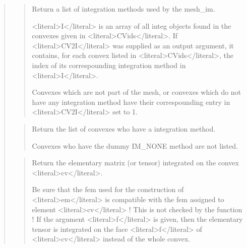 \documentclass[a4paper,11pt,english]{sphinxmanual}
\begin{document}
\sphinxAtStartPar
{}
\begin{quote}

\sphinxAtStartPar
{}
\begin{quote}

\sphinxAtStartPar
Return a list of integration methods used by the mesh\_im.

\sphinxAtStartPar
\textless{}literal\textgreater{}I\textless{}/literal\textgreater{} is an array of all integ objects found in the convexes
given in \textless{}literal\textgreater{}CVids\textless{}/literal\textgreater{}. If \textless{}literal\textgreater{}CV2I\textless{}/literal\textgreater{} was supplied as an output argument, it
contains, for each convex listed in \textless{}literal\textgreater{}CVids\textless{}/literal\textgreater{}, the index of its
correspounding integration method in \textless{}literal\textgreater{}I\textless{}/literal\textgreater{}.

\sphinxAtStartPar
Convexes which are not part of the mesh, or convexes which do
not have any integration method have their correspounding entry
in \textless{}literal\textgreater{}CV2I\textless{}/literal\textgreater{} set to \sphinxhyphen{}1.
\end{quote}

\sphinxAtStartPar
{}
\begin{quote}

\sphinxAtStartPar
Return the list of convexes who have a integration method.

\sphinxAtStartPar
Convexes who have the dummy IM\_NONE method are not listed.
\end{quote}

\sphinxAtStartPar
{}
\begin{quote}

\sphinxAtStartPar
Return the elementary matrix (or tensor) integrated on the convex \textless{}literal\textgreater{}cv\textless{}/literal\textgreater{}.

\sphinxAtStartPar
{}

\sphinxAtStartPar
Be sure that the fem used for the construction of \textless{}literal\textgreater{}em\textless{}/literal\textgreater{} is compatible
with the fem assigned to element \textless{}literal\textgreater{}cv\textless{}/literal\textgreater{} ! This is not checked by the
function ! If the argument \textless{}literal\textgreater{}f\textless{}/literal\textgreater{} is given, then the elementary tensor
is integrated on the face \textless{}literal\textgreater{}f\textless{}/literal\textgreater{} of \textless{}literal\textgreater{}cv\textless{}/literal\textgreater{} instead of the whole convex.
\end{quote}


\end{quote}
\end{document}
